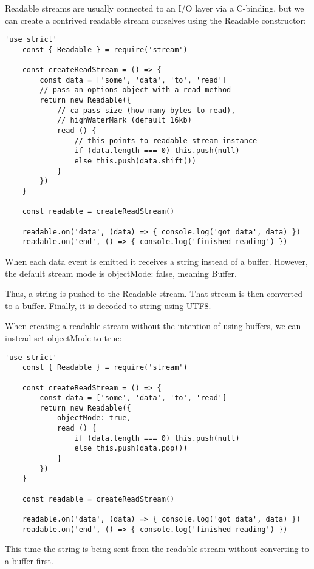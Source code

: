 \documentclass{scrartcl}
\begin{document}
Readable streams are usually connected to an I/O layer via a C-binding, but we can create a contrived readable stream ourselves using the Readable constructor:

\begin{lstlisting}[style=ES6]
    'use strict'
    const { Readable } = require('stream')

    const createReadStream = () => {
        const data = ['some', 'data', 'to', 'read']
        // pass an options object with a read method
        return new Readable({
            // ca pass size (how many bytes to read),
            // highWaterMark (default 16kb)
            read () {
                // this points to readable stream instance
                if (data.length === 0) this.push(null)
                else this.push(data.shift())
            }
        })
    }

    const readable = createReadStream()

    readable.on('data', (data) => { console.log('got data', data) })
    readable.on('end', () => { console.log('finished reading') })
\end{lstlisting}

When each data event is emitted it receives a string instead of a buffer.
However, the default stream mode is objectMode: false, meaning Buffer.


Thus, a string is pushed to the Readable stream. That stream is then converted to a buffer. Finally, it is decoded to string using UTF8.

When creating a readable stream without the intention of using buffers, we can instead set objectMode to true:

\begin{lstlisting}[style=ES6]
    'use strict'
    const { Readable } = require('stream')

    const createReadStream = () => {
        const data = ['some', 'data', 'to', 'read']
        return new Readable({
            objectMode: true,
            read () {
                if (data.length === 0) this.push(null)
                else this.push(data.pop())
            }
        })
    }

    const readable = createReadStream()

    readable.on('data', (data) => { console.log('got data', data) })
    readable.on('end', () => { console.log('finished reading') })
\end{lstlisting}

This time the string is being sent from the readable stream without converting to a buffer first.
\end{document}

